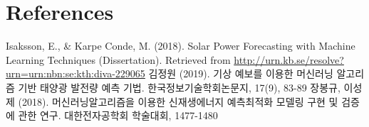 \documentclass{article}
\begin{document}
\section{References}
Isaksson, E., \& Karpe Conde, M. (2018). Solar Power Forecasting with Machine Learning Techniques (Dissertation). Retrieved from \url{http://urn.kb.se/resolve?urn=urn:nbn:se:kth:diva-229065} \newline
김정원 (2019). 기상 예보를 이용한 머신러닝 알고리즘 기반 태양광 발전량 예측 기법. 한국정보기술학회논문지, 17(9), 83-89 \newline
장봉규, 이성제 (2018). 머신러닝알고리즘을 이용한 신재생에너지 예측최적화 모델링 구현 및 검증에 관한 연구. 대한전자공학회 학술대회, 1477-1480
\end{document}
